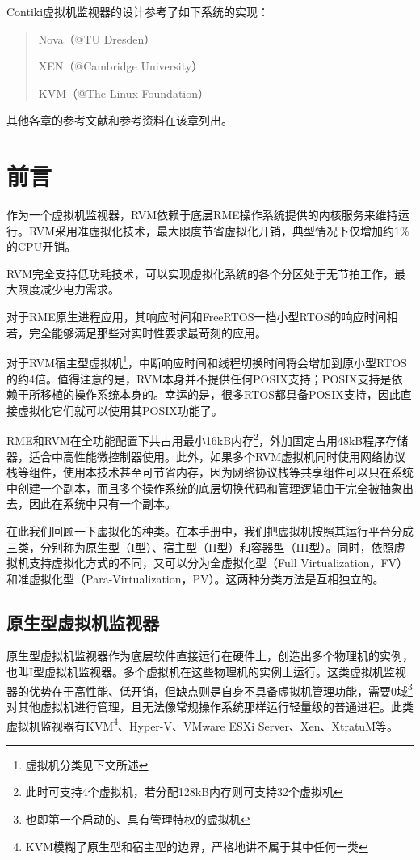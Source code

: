 Contiki虚拟机监视器的设计参考了如下系统的实现：

\begin{quote}
Nova（@TU Dresden）

XEN（@Cambridge University）

KVM（@The Linux Foundation）
\end{quote}

其他各章的参考文献和参考资料在该章列出。

\section{前言}\label{sec:1-2}

作为一个虚拟机监视器，RVM依赖于底层RME操作系统提供的内核服务来维持运行。RVM采用准虚拟化技术，最大限度节省虚拟化开销，典型情况下仅增加约1\%的CPU开销。

RVM完全支持低功耗技术，可以实现虚拟化系统的各个分区处于无节拍工作，最大限度减少电力需求。

对于RME原生进程应用，其响应时间和FreeRTOS一档小型RTOS的响应时间相若，完全能够满足那些对实时性要求最苛刻的应用。

对于RVM宿主型虚拟机\footnote{虚拟机分类见下文所述}，中断响应时间和线程切换时间将会增加到原小型RTOS的约4倍。值得注意的是，RVM本身并不提供任何POSIX支持；POSIX支持是依赖于所移植的操作系统本身的。幸运的是，很多RTOS都具备POSIX支持，因此直接虚拟化它们就可以使用其POSIX功能了。

RME和RVM在全功能配置下共占用最小16kB内存\footnote{此时可支持4个虚拟机，若分配128kB内存则可支持32个虚拟机}，外加固定占用48kB程序存储器，适合中高性能微控制器使用。此外，如果多个RVM虚拟机同时使用网络协议栈等组件，使用本技术甚至可节省内存，因为网络协议栈等共享组件可以只在系统中创建一个副本，而且多个操作系统的底层切换代码和管理逻辑由于完全被抽象出去，因此在系统中只有一个副本。

在此我们回顾一下虚拟化的种类。在本手册中，我们把虚拟机按照其运行平台分成三类，分别称为原生型（I型）、宿主型（II型）和容器型（III型）。同时，依照虚拟机支持虚拟化方式的不同，又可以分为全虚拟化型（Full
Virtualization，FV）和准虚拟化型（Para-Virtualization，PV）。这两种分类方法是互相独立的。

\subsection{原生型虚拟机监视器}\label{subsec:1-2-1}

原生型虚拟机监视器作为底层软件直接运行在硬件上，创造出多个物理机的实例，也叫I型虚拟机监视器。多个虚拟机在这些物理机的实例上运行。这类虚拟机监视器的优势在于高性能、低开销，但缺点则是自身不具备虚拟机管理功能，需要0域\footnote{也即第一个启动的、具有管理特权的虚拟机}对其他虚拟机进行管理，且无法像常规操作系统那样运行轻量级的普通进程。此类虚拟机监视器有KVM\footnote{KVM模糊了原生型和宿主型的边界，严格地讲不属于其中任何一类}、Hyper-V、VMware ESXi Server、Xen、XtratuM等。

